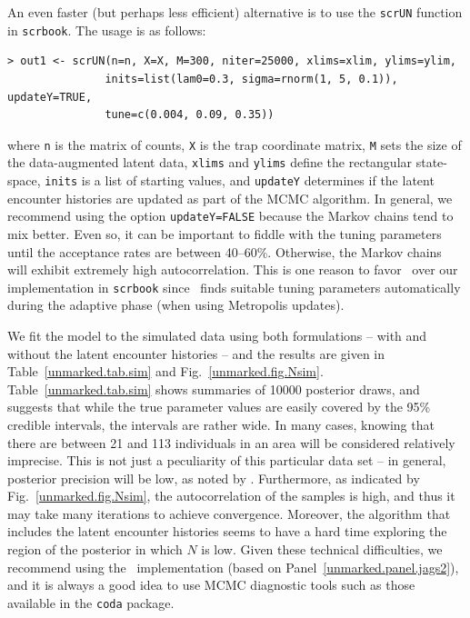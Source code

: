 An even faster (but perhaps less efficient) alternative is to use the
\verb+scrUN+ function in
\texttt{scrbook}.
The usage is as follows:
\begin{small}
\begin{verbatim}
> out1 <- scrUN(n=n, X=X, M=300, niter=25000, xlims=xlim, ylims=ylim,
               inits=list(lam0=0.3, sigma=rnorm(1, 5, 0.1)), updateY=TRUE,
               tune=c(0.004, 0.09, 0.35))
\end{verbatim}
\end{small}
where \verb+n+ is the matrix of counts, \verb+X+ is the trap
coordinate matrix, \verb+M+ sets the size of the data-augmented latent
data, \verb+xlims+ and \verb+ylims+ define the
rectangular state-space, \verb+inits+ is a list of starting values,
and \verb+updateY+ determines if the latent encounter histories are
updated as part of the MCMC algorithm. In general, %
we recommend using the option
\verb+updateY=FALSE+ because the Markov chains tend to mix
better. %
Even so, it can be important to fiddle with the tuning parameters until the
acceptance rates are between 40--60\%. Otherwise, the Markov chains
will exhibit extremely high autocorrelation. This is one reason to favor
\jags~over our implementation in \texttt{scrbook} since \jags~finds
suitable tuning parameters automatically during the adaptive phase
(when using Metropolis updates).

We fit the model to the simulated data using both formulations -- with and without
the latent encounter histories -- %
and the results
are given in Table~\ref{unmarked.tab.sim} and
Fig.~\ref{unmarked.fig.Nsim}.
Table~\ref{unmarked.tab.sim} shows %
summaries of 10000 posterior draws, and suggests that while the
true parameter values are easily covered by the 95\% credible
intervals, the intervals are rather wide. In many cases, knowing that
there are between 21 and 113 individuals in an area will be considered
relatively imprecise.
This is not just a
peculiarity of this particular data set -- in general, posterior
precision will be low, as noted by
\citet{chandler_royle:2012}. Furthermore,
as indicated by
Fig.~\ref{unmarked.fig.Nsim}, the autocorrelation of the samples is
high, and thus it may take many iterations to achieve convergence.
Moreover, the algorithm that includes the latent encounter histories
seems to have a hard time exploring the region of the posterior in
which $N$ is low. Given these technical difficulties, we recommend
using the \jags~implementation (based on
Panel~\ref{unmarked.panel.jags2}), and it is always a good idea to use
MCMC diagnostic tools such as those available in the \texttt{coda} package.

